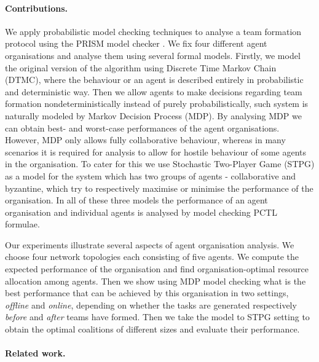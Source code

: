 \documentclass{llncs}
\newcommand{\comment}[1]{{\color{red}{[\sf #1]}}}
\begin{document}
\paragraph{Contributions.} We apply probabilistic model checking techniques to analyse a team
formation protocol \cite{gaston2005agent} using the PRISM model checker \cite{KNP11}. We fix four different agent organisations and analyse them using several formal models. Firstly, we model the original version of the algorithm using Discrete Time Markov Chain (DTMC), where the behaviour or an agent is described entirely in probabilistic and deterministic way. Then we allow agents to make decisions regarding team formation nondeterministically instead of purely probabilistically, such system is naturally modeled by Markov Decision Process (MDP). By analysing MDP we can obtain best- and worst-case performances of the agent organisations. However, MDP only allows fully collaborative behaviour, whereas in many scenarios it is required for analysis to allow for hostile behaviour of some agents in the organisation. To cater for this we use Stochastic Two-Player Game (STPG) as a model for the system which has two groups of agents - collaborative and byzantine, which try to respectively maximise or minimise the performance of the organisation. In all of these three models the performance of an agent organisation and individual agents is analysed by model checking PCTL formulae.

Our experiments illustrate several aspects of agent organisation analysis. We choose four network topologies each consisting of five agents. We  compute the expected performance of the organisation and find organisation-optimal resource allocation among agents. Then we show using MDP model checking what is the best performance that can be achieved by this organisation in two settings, \emph{offline} and \emph{online}, depending on whether the tasks are generated respectively \emph{before} and \emph{after} teams have formed. Then we take the model to STPG setting to obtain the optimal coalitions of different sizes and evaluate their performance.

\comment{add several advantages of our approach - base on results. }




\paragraph{Related work.}
\end{document}
